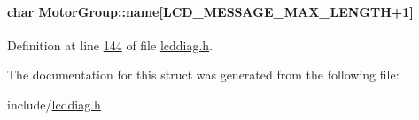 \paragraph[{\texorpdfstring{name}{name}}]{\setlength{\rightskip}{0pt plus 5cm}char Motor\+Group\+::name\mbox{[}{\bf L\+C\+D\+\_\+\+M\+E\+S\+S\+A\+G\+E\+\_\+\+M\+A\+X\+\_\+\+L\+E\+N\+G\+TH}+1\mbox{]}}\hypertarget{struct_motor_group_a8f7c6b03cfece909eb0db0b67ce24e6a}{}\label{struct_motor_group_a8f7c6b03cfece909eb0db0b67ce24e6a}


Definition at line \hyperlink{lcddiag_8h_source_l00144}{144} of file \hyperlink{lcddiag_8h_source}{lcddiag.\+h}.



The documentation for this struct was generated from the following file\+:\begin{DoxyCompactItemize}
\item 
include/\hyperlink{lcddiag_8h}{lcddiag.\+h}\end{DoxyCompactItemize}
